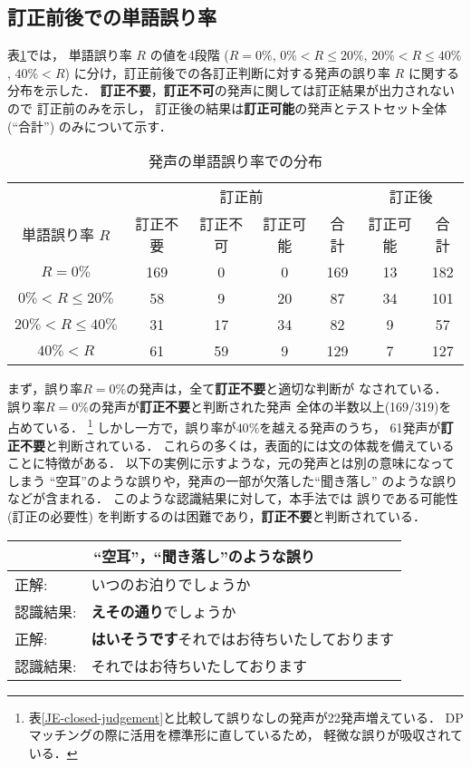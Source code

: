 \subsection{訂正前後での単語誤り率}
\label{subsection-JE-closed-4}

表\ref{JE-closed-R-rank}では，
単語誤り率 $R$ の値を4段階
($R = 0\%$, $0\% < R \leq 20\%$, $20\% < R \leq 40\%$, $40\% < R$)
に分け，訂正前後での各訂正判断に対する発声の誤り率 $R$ に関する
分布を示した．
{\bf 訂正不要}，{\bf 訂正不可}の発声に関しては訂正結果が出力されないので
訂正前のみを示し，
訂正後の結果は{\bf 訂正可能}の発声とテストセット全体(``合計'')
のみについて示す．

\begin{table}
\begin{center}
\caption{発声の単語誤り率での分布}
\begin{tabular}{|c||c|c|c||c||c||c|} \hline
 & \multicolumn{4}{c||}{訂正前} & \multicolumn{2}{c|}{訂正後}\\ \cline{2-7}
単語誤り率 $R$ & 訂正不要 & 訂正不可 & 訂正可能 & 合計 & 訂正可能 & 合計\\ \hline\hline
$R = 0\%$ & 169 & 0 & 0 & 169 & 13 & 182 \\ \hline
$0\% < R \leq 20\%$ & 58 & 9 & 20 & 87 & 34 & 101 \\ \hline
$20\% < R \leq 40\%$ & 31 & 17 & 34 & 82 & 9 & 57 \\ \hline
$40\% < R$ & 61 & 59 & 9 & 129 & 7 & 127 \\ \hline
\end{tabular}
\label{JE-closed-R-rank}
\end{center}
\end{table}

まず，誤り率$R = 0\%$の発声は，全て{\bf 訂正不要}と適切な判断が
なされている．
誤り率$R = 0\%$の発声が{\bf 訂正不要}と判断された発声
全体の半数以上(169/319)を占めている．
\footnote{
表\ref{JE-closed-judgement}と比較して誤りなしの発声が22発声増えている．
DPマッチングの際に活用を標準形に直しているため，
軽微な誤りが吸収されている．
}
しかし一方で，誤り率が$40\%$を越える発声のうち，
61発声が{\bf 訂正不要}と判断されている．
これらの多くは，表面的には文の体裁を備えていることに特徴がある．
以下の実例に示すような，元の発声とは別の意味になってしまう
``空耳''のような誤りや，発声の一部が欠落した``聞き落し''
のような誤りなどが含まれる．
このような認識結果に対して，本手法では
誤りである可能性(訂正の必要性)
を判断するのは困難であり，{\bf 訂正不要}と判断されている．

\begin{center}
\begin{tabular}{|ll|}
\multicolumn{2}{c}{``空耳''，``聞き落し''のような誤り}\\
\hline
正解: & いつのお泊りでしょうか \\
認識結果: & {\bf えその通り}でしょうか \\
\hline
正解: & {\bf はいそうです}それではお待ちいたしております \\
認識結果: & それではお待ちいたしております \\
\hline
\end{tabular}
\end{center}

